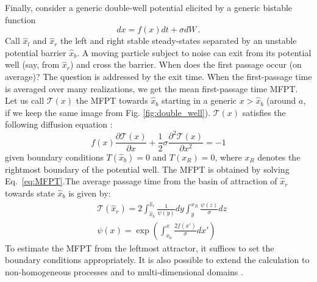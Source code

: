 Finally, consider a generic double-well potential elicited by a generic bistable function 
\begin{equation}
	dx = f(x) dt + \sigma dW \, .
\end{equation}
Call $\hat{x}_l$ and $\hat{x}_r$ the left and right stable steady-states separated by an unstable potential barrier $\hat{x}_b$. A moving particle subject to noise can exit from its potential well (say, from $\hat{x}_r$) and cross the barrier. When does the first passage occur (on average)? The question is addressed by the exit time. When the first-passage time is averaged over many realizations, we get the mean first-passage time \gls{MFPT}. Let us call $\mathcal{T}(x)$ the MFPT towards $\hat{x}_b$ starting in a generic $x > \hat{x}_b$ (around $a$, if we keep the same image from Fig. \ref{fig:double_well}).  $\mathcal{T}(x)$ satisfies the following diffusion equation \citep{Gardiner1985}:
\begin{equation}
	f(x)\frac{\partial \mathcal{T}(x)}{\partial x} + \frac{1}{2}\sigma \frac{\partial^2 \mathcal{T}(x)}{\partial x^2} = -1
	\label{eq:MFPT}
\end{equation}
given boundary conditions $T(\hat{x}_b) = 0$ and $T(x_{R}) = 0$, where $x_{R}$ denotes the rightmost boundary of the potential well. The \gls{MFPT} is obtained by solving Eq.~\ref{eq:MFPT}.The average passage time from the basin of attraction of $\hat{x}_r$ towards state $\hat{x}_b$ is given by:
\begin{align}
	\nonumber & \mathcal{T}(\hat{x}_r) = 2 \int^{\hat{x}_r}_{\hat{x}_b} \frac{1}{\psi(y)}dy \int^{x_{R}}_y \frac{\psi(z)}{\sigma}dz \\ 
	& \psi(x) = \exp \left(  \int_{x_0}^{x} \frac{2 f(x')}{\sigma} dx' \right)
	\label{eq:MFPT_final}
\end{align}
To estimate the \gls{MFPT} from the leftmost attractor, it suffices to set the boundary conditions appropriately. It is also possible to extend the calculation to non-homogeneous processes and to multi-dimensional domains \citep{Gardiner1985,Arnold1983}.





